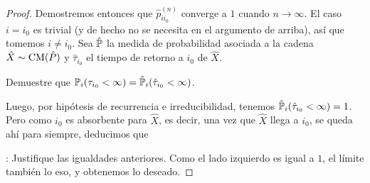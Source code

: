 \begin{proof}
Demostremos entonces que $\hat p^{(n)}_{ii_0}$ converge a $1$ cuando $n\to\infty$.
El caso $i=i_0$ es trivial (y de hecho no se necesita en el argumento de arriba), así que tomemos $i\neq i_0$.
Sea $\hat{\mathbb{P}}$ la medida de probabilidad asociada a la cadena $\hat X\sim\text{\upshape{CM}}(\hat P)$ y $\hat\tau_{i_0}$ el tiempo de retorno a $i_0$ de $\hat X$.
\begin{exer}
Demuestre que $\mathbb{P}_i(\tau_{i_0}<\infty)=\hat{\mathbb{P}}_i(\hat\tau_{i_0}<\infty)$.
\end{exer}
\noindent Luego, por hipótesis de recurrencia e irreducibilidad, tenemos $\hat{\mathbb{P}}_i(\hat\tau_{i_0}<\infty)=1$.
Pero como $i_0$ es absorbente para $\hat X$, es decir, una vez que $\hat X$ llega a $i_0$, se queda ahí para siempre, deducimos que

\uexer: Justifique las igualdades anteriores.
Como el lado izquierdo es igual a $1$, el límite también lo eso, y obtenemos lo deseado.
\end{proof}

